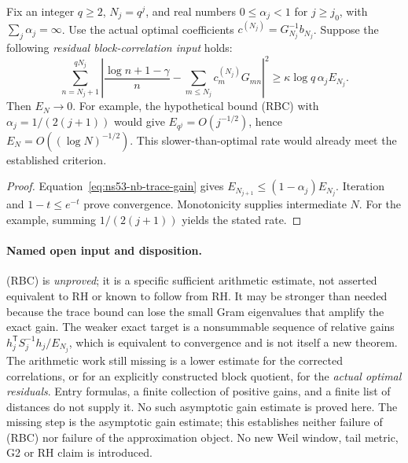 \begin{proposition}
\label{prop:ns53-nb-any-rate}
Fix an integer $q\geq2$, $N_j=q^j$, and real numbers
$0\leq\alpha_j<1$ for $j\geq j_0$, with $\sum_j\alpha_j=\infty$.
Use the actual optimal coefficients $c^{(N_j)}=G_{N_j}^{-1}b_{N_j}$.
Suppose the following \emph{residual block-correlation input} holds:
\begin{equation}
 \sum_{n=N_j+1}^{qN_j}
 \left|\frac{\log n+1-\gamma}{n}
       -\sum_{m\leq N_j}c_m^{(N_j)}G_{mn}\right|^2
 \geq\kappa\log q\,\alpha_j E_{N_j}.
 \tag{RBC}\label{eq:ns53-nb-rbc}
\end{equation}
Then $E_N\to0$. For example, the hypothetical bound (RBC) with
$\alpha_j=1/(2(j+1))$ would give
$E_{q^j}=O(j^{-1/2})$, hence $E_N=O((\log N)^{-1/2})$.
This slower-than-optimal rate would already meet the established criterion.
\end{proposition}

\begin{proof}
Equation~\eqref{eq:ns53-nb-trace-gain} gives
$E_{N_{j+1}}\leq(1-\alpha_j)E_{N_j}$. Iteration and
$1-t\leq e^{-t}$ prove convergence. Monotonicity supplies intermediate
$N$. For the example, summing $1/(2(j+1))$ yields the stated rate.
\end{proof}

\paragraph{Named open input and disposition.}
(RBC) is \emph{unproved}; it is a specific sufficient arithmetic estimate,
not asserted equivalent to RH or known to follow from RH. It may be
stronger than needed because the trace bound can lose the small
Gram eigenvalues that amplify the exact gain. The weaker exact target is
a nonsummable sequence of relative gains
$h_j^{\mathsf T}S_j^{-1}h_j/E_{N_j}$, which is equivalent to convergence
and is not itself a new theorem. The arithmetic work still missing is
a lower estimate for the corrected correlations, or for an explicitly
constructed block quotient, for the \emph{actual optimal residuals}.
Entry formulas, a finite collection of positive gains, and a finite list of distances
do not supply it. No such asymptotic gain estimate is proved here.
The missing step is the asymptotic gain estimate; this establishes
neither failure of (RBC) nor failure of the approximation object. No new Weil window, tail metric, G2 or RH
claim is introduced.
